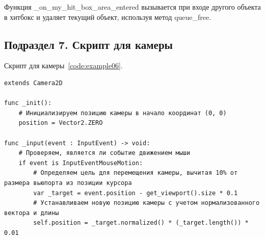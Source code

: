 Функция \_on\_my\_hit\_box\_area\_entered вызывается при входе другого объекта в хитбокс и удаляет текущий объект, используя метод queue\_free.

\subsection{\label{subsec:ch02/sec01/sub07}Подраздел 7. Скрипт для камеры}
Скрипт для камеры~\ref{code:example06}.
\begin{code}
\vspace{-\baselineskip}\begin{verbatim}
extends Camera2D

func _init():
    # Инициализируем позицию камеры в начало координат (0, 0)
    position = Vector2.ZERO

func _input(event : InputEvent) -> void:
    # Проверяем, является ли событие движением мыши
    if event is InputEventMouseMotion:
        # Определяем цель для перемещения камеры, вычитая 10% от размера вьюпорта из позиции курсора
        var _target = event.position - get_viewport().size * 0.1
        # Устанавливаем новую позицию камеры с учетом нормализованного вектора и длины
        self.position = _target.normalized() * (_target.length()) * 0.01


\end{verbatim}
\end{code}

